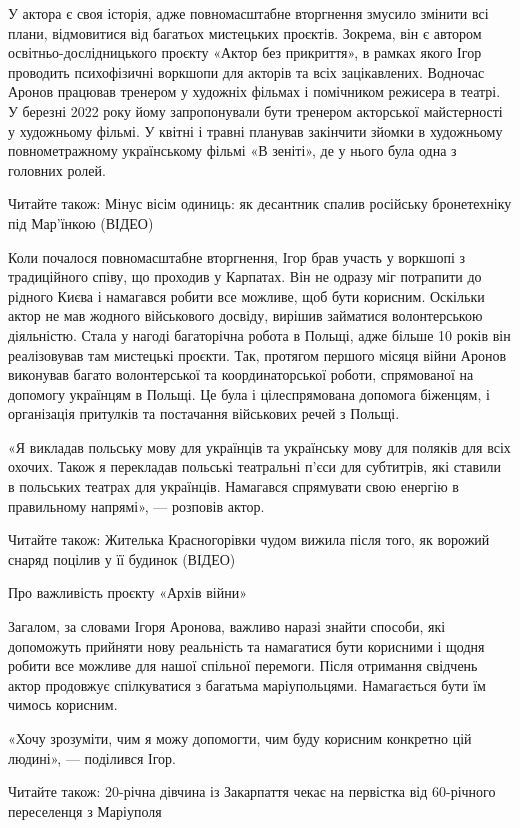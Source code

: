 У актора є своя історія, адже повномасштабне вторгнення змусило змінити всі
плани, відмовитися від багатьох мистецьких проєктів. Зокрема, він є автором
освітньо-дослідницького проєкту «Актор без прикриття», в рамках якого Ігор
проводить психофізичні воркшопи для акторів та всіх зацікавлених. Водночас
Аронов працював тренером у художніх фільмах і помічником режисера в театрі. У
березні 2022 року йому запропонували бути тренером акторської майстерності у
художньому фільмі. У квітні і травні планував закінчити зйомки в художньому
повнометражному українському фільмі «В зеніті», де у нього була одна з головних
ролей.

Читайте також: Мінус вісім одиниць: як десантник спалив російську бронетехніку
під Мар'їнкою (ВІДЕО)

Коли почалося повномасштабне вторгнення, Ігор брав участь у воркшопі з
традиційного співу, що проходив у Карпатах. Він не одразу міг потрапити до
рідного Києва і намагався робити все можливе, щоб бути корисним. Оскільки актор
не мав жодного військового досвіду, вирішив займатися волонтерською діяльністю.
Стала у нагоді багаторічна робота в Польщі, адже більше 10 років він
реалізовував там мистецькі проєкти. Так, протягом першого місяця війни Аронов
виконував багато волонтерської та координаторської роботи, спрямованої на
допомогу українцям в Польщі. Це була і цілеспрямована допомога біженцям, і
організація притулків та постачання військових речей з Польщі.

«Я викладав польську мову для українців та українську мову для поляків для всіх
охочих. Також я перекладав польські театральні п'єси для субтитрів, які ставили
в польських театрах для українців. Намагався спрямувати свою енергію в
правильному напрямі», — розповів актор.

Читайте також: Жителька Красногорівки чудом вижила після того, як ворожий
снаряд поцілив у її будинок (ВІДЕО)

Про важливість проєкту «Архів війни»

Загалом, за словами Ігоря Аронова, важливо наразі знайти способи, які
допоможуть прийняти нову реальність та намагатися бути корисними і щодня робити
все можливе для нашої спільної перемоги. Після отримання свідчень актор
продовжує спілкуватися з багатьма маріупольцями. Намагається бути їм чимось
корисним.

«Хочу зрозуміти, чим я можу допомогти, чим буду корисним конкретно цій людині»,
— поділився Ігор.

Читайте також: 20-річна дівчина із Закарпаття чекає на первістка від 60-річного переселенця з Маріуполя

